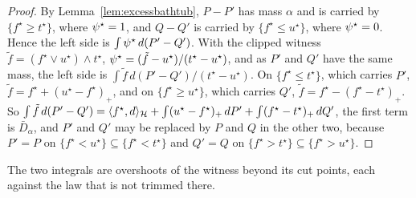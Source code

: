\begin{proof}
By Lemma~\ref{lem:excessbathtub}, $P-P'$ has mass $\alpha$ and is carried by $\{f^\star\ge t^\star\}$, where
$\psi^\star=1$, and $Q-Q'$ is carried by $\{f^\star\le u^\star\}$, where $\psi^\star=0$. Hence the left side
is $\int\psi^\star\,d(P'-Q')$. With the clipped witness $\tilde f=(f^\star\vee u^\star)\wedge t^\star$,
$\psi^\star=(\tilde f-u^\star)/(t^\star-u^\star)$, and as $P'$ and $Q'$ have the same mass, the left side is
$\int\tilde f\,d(P'-Q')/(t^\star-u^\star)$. On $\{f^\star\le t^\star\}$, which carries $P'$,
$\tilde f=f^\star+(u^\star-f^\star)_+$, and on $\{f^\star\ge u^\star\}$, which carries $Q'$,
$\tilde f=f^\star-(f^\star-t^\star)_+$. So $\int\tilde f\,d(P'-Q')=\langle f^\star,d\rangle_{\mathcal{H}}+\int(u^\star-f^\star)_+\,dP'
+\int(f^\star-t^\star)_+\,dQ'$, the first term is $\bar D_\alpha$, and $P'$ and $Q'$ may be replaced by $P$ and $Q$ in the
other two, because $P'=P$ on $\{f^\star<u^\star\}\subseteq\{f^\star<t^\star\}$ and $Q'=Q$ on
$\{f^\star>t^\star\}\subseteq\{f^\star>u^\star\}$.
\end{proof}

The two integrals are overshoots of the witness beyond its cut points, each against the law that is not trimmed there.

